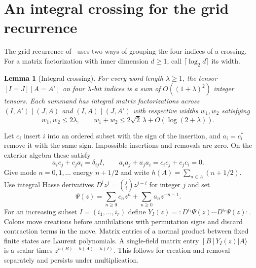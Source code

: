 \documentclass[11pt]{article}
\newtheorem{lemma}[theorem]{Lemma}
\theoremstyle{remark}
\begin{document}
\appendix
{}
\section{An integral crossing for the grid recurrence}\label{integral}
The grid recurrence of~\cite[Appendix~A]{grid-sat} uses two ways of grouping the four indices of a crossing. For a matrix factorization with inner dimension \(d\ge1\), call \(\lceil\log_2 d\rceil\) its width.

\begin{lemma}[Integral crossing]\label{crossing}
For every word length \(\lambda\ge1\), the tensor \([I=J][A=A']\) on four \(\lambda\)-bit indices is a sum of \(O((1+\lambda)^2)\) integer tensors. Each summand has integral matrix factorizations across \((I,A')\mid(J,A)\) and \((I,A)\mid(J,A')\) with respective widths \(w_1,w_2\) satisfying
\[
  w_1,w_2\le2\lambda,\qquad
  w_1+w_2\le2\sqrt2\,\lambda+O(\log(2+\lambda)).
\]
\end{lemma}

Let \(c_i\) insert \(i\) into an ordered subset with the sign of the insertion, and \(a_i=c_i^*\) remove it with the same sign. Impossible insertions and removals are zero. On the exterior algebra these satisfy
\[
 a_i c_j+c_j a_i=\delta_{ij}I,\qquad
 a_i a_j+a_j a_i=c_i c_j+c_j c_i=0.
\]
Give mode \(n=0,1,\ldots\) energy \(n+1/2\) and write \(h(A)=\sum_{n\in A}(n+1/2)\). Use integral Hasse derivatives \(D^i z^j=\binom ji z^{j-i}\) for integer \(j\) and set
\[
 \Psi(z)=\sum_{n\ge0} c_n z^n +\sum_{n\ge0} a_n z^{-n-1}.
\]
For an increasing subset \(I=(i_1,\ldots,i_r)\) define \(Y_I(z)=:D^{i_1}\Psi(z)\cdots D^{i_r}\Psi(z):\). Colons move creations before annihilations with permutation signs and discard contraction terms in the move. Matrix entries of a normal product between fixed finite states are Laurent polynomials. A single-field matrix entry \([B]Y_I(z)|A\rangle\) is a scalar times \(z^{h(B)-h(A)-h(I)}\). This follows for creation and removal separately and persists under multiplication.
\end{document}
